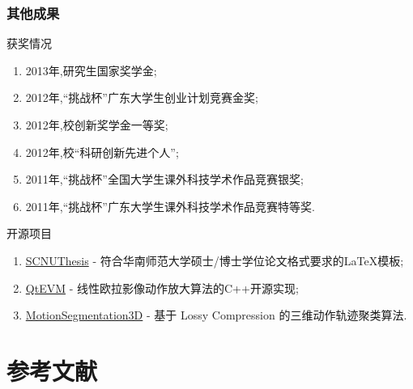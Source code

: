 \documentclass[xcolor=svgnames,serif,table,10pt]{beamer}
\begin{document}
\begin{frame}
  \frametitle{其他成果}
  \begin{block}{获奖情况}
    \scriptsize\sffamily
    \begin{enumerate}
    \item 2013年,研究生国家奖学金;
    \item 2012年,“挑战杯”广东大学生创业计划竞赛金奖;
    \item 2012年,校创新奖学金一等奖;
    \item 2012年,校“科研创新先进个人”;
    \item 2011年,“挑战杯”全国大学生课外科技学术作品竞赛银奖;
    \item 2011年,“挑战杯”广东大学生课外科技学术作品竞赛特等奖.
    \end{enumerate}
  \end{block}
  \pause
  \begin{block}{开源项目}
    \scriptsize\sffamily
    \begin{enumerate}
    \item \href{http://github.com/wzpan/scnuthesis}{SCNUThesis} - 符合华南师范大学硕士/博士学位论文格式要求的\LaTeX 模板;
    \item \href{http://github.com/wzpan/QtEVM}{QtEVM} - 线性欧拉影像动作放大算法的C++开源实现;
    \item \href{http://github.com/wzpan/MotionSegmentation3D}{MotionSegmentation3D} - 基于 Lossy Compression 的三维动作轨迹聚类算法.
    \end{enumerate}
  \end{block}
\end{frame}

\section*{参考文献}
\end{document}
